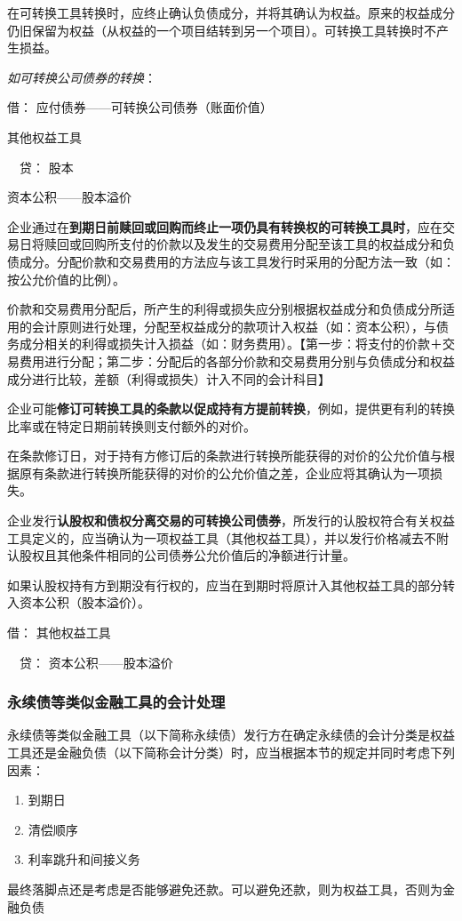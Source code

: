 \documentclass[UTF8,12pt]{ctexart}
\newenvironment{Dr}{\noindent 借：}{\par}
\newenvironment{Cr}{\noindent \ \ 贷：}{\par}
\numberwithin{equation}{section} %
\numberwithin{figure}{section}
\numberwithin{table}{section}
\begin{document}
	在可转换工具转换时，应终止确认负债成分，并将其确认为权益。原来的权益成分仍旧保留为权益（从权益的一个项目结转到另一个项目）。可转换工具转换时不产生损益。
	
	\textit{如可转换公司债券的转换}：
	
	\begin{Dr}
		应付债券——可转换公司债券（账面价值）
		
		其他权益工具
	\end{Dr}
	\begin{Cr}
		股本
		
		资本公积——股本溢价
	\end{Cr}
	
	
	企业通过在\textbf{到期日前赎回或回购而终止一项仍具有转换权的可转换工具时}，应在交易日将赎回或回购所支付的价款以及发生的交易费用分配至该工具的权益成分和负债成分。分配价款和交易费用的方法应与该工具发行时采用的分配方法一致（如：按公允价值的比例）。
	
	价款和交易费用分配后，所产生的利得或损失应分别根据权益成分和负债成分所适用的会计原则进行处理，分配至权益成分的款项计入权益（如：资本公积），与债务成分相关的利得或损失计入损益（如：财务费用）。【第一步：将支付的价款＋交易费用进行分配；第二步：分配后的各部分价款和交易费用分别与负债成分和权益成分进行比较，差额（利得或损失）计入不同的会计科目】
	
	企业可能\textbf{修订可转换工具的条款以促成持有方提前转换}，例如，提供更有利的转换比率或在特定日期前转换则支付额外的对价。
	
	在条款修订日，对于持有方修订后的条款进行转换所能获得的对价的公允价值与根据原有条款进行转换所能获得的对价的公允价值之差，企业应将其确认为一项损失。
	
	企业发行\textbf{认股权和债权分离交易的可转换公司债券}，所发行的认股权符合有关权益工具定义的，应当确认为一项权益工具（其他权益工具），并以发行价格减去不附认股权且其他条件相同的公司债券公允价值后的净额进行计量。
	
	如果认股权持有方到期没有行权的，应当在到期时将原计入其他权益工具的部分转入资本公积（股本溢价）。
	
	\begin{Dr}
		其他权益工具
	\end{Dr}
	\begin{Cr}
		资本公积——股本溢价
	\end{Cr}

	
	
	\subsubsection{永续债等类似金融工具的会计处理}
	永续债等类似金融工具（以下简称永续债）发行方在确定永续债的会计分类是权益工具还是金融负债（以下简称会计分类）时，应当根据本节的规定并同时考虑下列因素：
	\begin{enumerate}
		\item 到期日
		
		\item 清偿顺序
		
		\item 利率跳升和间接义务
	\end{enumerate}
	最终落脚点还是考虑是否能够避免还款。可以避免还款，则为权益工具，否则为金融负债
	
\end{document}
